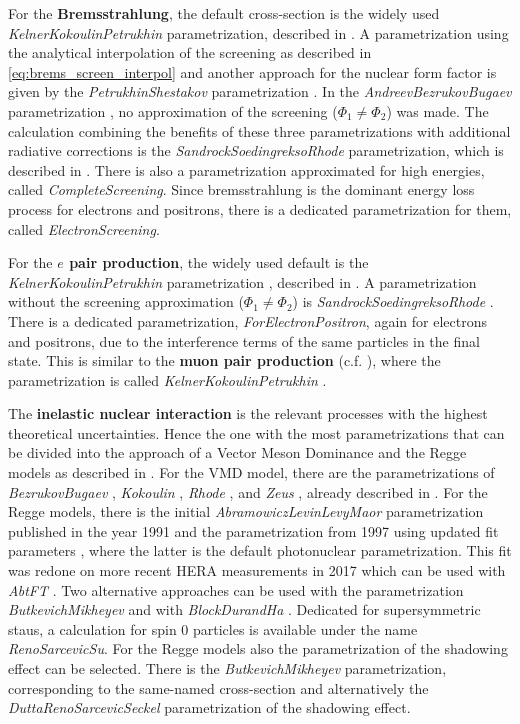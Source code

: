 For the \textbf{Bremsstrahlung}, the default cross-section is the widely used \textit{KelnerKokoulinPetrukhin} parametrization, described in .
A parametrization using the analytical interpolation of the screening as described in \eqref{eq:brems_screen_interpol} and another approach for the nuclear form factor is given by the \textit{PetrukhinShestakov} parametrization \cite{Petrukhin68}.
In the \textit{AndreevBezrukovBugaev} parametrization \cite{Andreev94Brems}, no approximation of the screening ($\Phi_1 \neq \Phi_2$) was made.
The calculation combining the benefits of these three parametrizations with additional radiative corrections is the \textit{SandrockSoedingreksoRhode} parametrization, which is described in .
There is also a parametrization approximated for high energies, called \textit{CompleteScreening}.
Since bremsstrahlung is the dominant energy loss process for electrons and positrons, there is a dedicated parametrization for them, called \textit{ElectronScreening}.

For the \textbf{$e$ pair production}, the widely used default is the \textit{KelnerKokoulinPetrukhin} parametrization \cite{Kokoulin71, Kelner98}, described in .
A parametrization without the screening approximation ($\Phi_1 \neq \Phi_2$) is \textit{SandrockSoedingreksoRhode} \cite{Soedingrekso19ICRC}.
There is a dedicated parametrization, \textit{ForElectronPositron}, again for electrons and positrons, due to the interference terms of the same particles in the final state.
This is similar to the \textbf{muon pair production} (c.f. ), where the parametrization is called \textit{KelnerKokoulinPetrukhin} \cite{Kelner00mupair}.

The \textbf{inelastic nuclear interaction} is the relevant processes with the highest theoretical uncertainties.
Hence the one with the most parametrizations that can be divided into the approach of a Vector Meson Dominance and the Regge models as described in .
For the VMD model, there are the parametrizations of \textit{BezrukovBugaev} \cite{Bezrukov80}, \textit{Kokoulin} \cite{Kokoulin97}, \textit{Rhode} \cite{Rhode93PhD}, and \textit{Zeus} \cite{Breitweg99ZEUS}, already described in .
For the Regge models, there is the initial \textit{AbramowiczLevinLevyMaor} parametrization published in the year 1991 \cite{Abramowicz91} and the parametrization from 1997 using updated fit parameters \cite{Abramowicz97}, where the latter is the default photonuclear parametrization.
This fit was redone on more recent HERA measurements in 2017 which can be used with \textit{AbtFT} \cite{Abt17PhotoQ2}.
Two alternative approaches can be used with the parametrization \textit{ButkevichMikheyev} \cite{Butkevich02} and with \textit{BlockDurandHa} \cite{Block14}.
Dedicated for supersymmetric staus, a calculation for spin 0 particles is available under the name \textit{RenoSarcevicSu}.
For the Regge models also the parametrization of the shadowing effect can be selected.
There is the \textit{ButkevichMikheyev} parametrization, corresponding to the same-named cross-section and alternatively the \textit{DuttaRenoSarcevicSeckel} \cite{Dutta01} parametrization of the shadowing effect.

